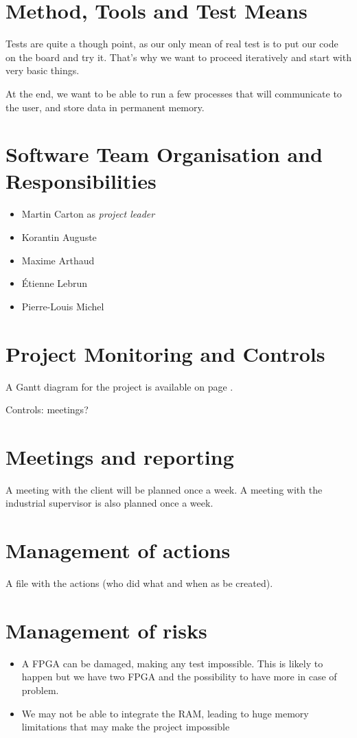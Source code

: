\documentclass{article}
\begin{document}
  \section{Method, Tools and Test Means}
    Tests are quite a though point, as our only mean of real test is to put our
    code on the board and try it. That's why we want to proceed iteratively and
    start with very basic things.

    At the end, we want to be able to run a few processes that will communicate
    to the user, and store data in permanent memory.

  \section{Software Team Organisation and Responsibilities}
    \begin{itemize}
      \item Martin Carton as \textit{project leader}
      \item Korantin Auguste
      \item Maxime Arthaud
      \item Étienne Lebrun
      \item Pierre-Louis Michel
    \end{itemize}

  \section{Project Monitoring and Controls}
    A Gantt diagram for the project is available on page \pageref{fig:gantt}.

    Controls: meetings?

    \afterpage{}

  \section{Meetings and reporting}
    A meeting with the client will be planned once a week. A meeting with the
    industrial supervisor is also planned once a week.

  \section{Management of actions}
    A file with the actions (who did what and when as be created).

  \section{Management of risks}
    \begin{itemize}
      \item A FPGA can be damaged, making any test impossible. This is likely to
          happen but we have two FPGA and the possibility to have more in case
          of problem.
      \item We may not be able to integrate the RAM, leading to huge memory
          limitations that may make the project impossible
    \end{itemize}
\end{document}

